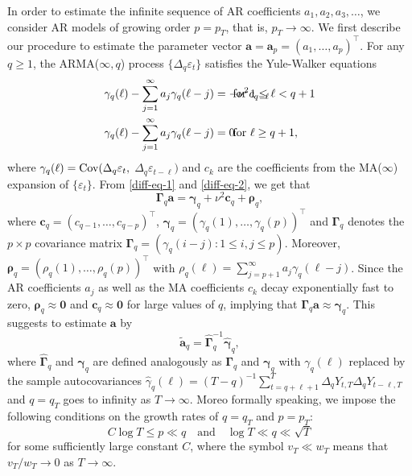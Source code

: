 In order to estimate the infinite sequence of AR coefficients $a_1,a_2,a_3,\ldots$, we consider AR models of growing order $p = p_T$, that is, $p_T \rightarrow \infty$. We first describe our procedure to estimate the parameter vector $\boldsymbol{a} = \boldsymbol{a}_p = (a_1,\ldots,a_p)^\top$. For any $q \ge 1$, the ARMA($\infty,q$) process $\{ \Delta_q \varepsilon_t \}$ satisfies the Yule-Walker equations
\begin{align}
\gamma_q(\ell) - \sum\limits_{j=1}^\infty a_j \gamma_q(\ell-j) & = -\nu^2 c_{q-\ell} \hspace{-1.5cm} & & \text{for } 1 \le \ell < q+1 \label{diff-eq-1} \\
\gamma_q(\ell) - \sum\limits_{j=1}^\infty a_j \gamma_q(\ell-j) & = 0 \hspace{-1.5cm} & & \text{for } \ell \ge q+1, \label{diff-eq-2}  
\end{align}
where $\gamma_q(\ell) = \textnormal{Cov}(\Delta_q \varepsilon_t,$ $\Delta_q \varepsilon_{t-\ell})$ and $c_k$ are the coefficients from the MA($\infty$) expansion of $\{ \varepsilon_t \}$. From \eqref{diff-eq-1} and \eqref{diff-eq-2}, we get that 
\begin{equation}\label{YW-eq} 
\boldsymbol{\Gamma}_q \boldsymbol{a} = \boldsymbol{\gamma}_q + \nu^2 \boldsymbol{c}_q + \boldsymbol{\rho}_q,  
\end{equation} 
where $\boldsymbol{c}_q = (c_{q-1},\dots,c_{q-p})^\top$, $\boldsymbol{\gamma}_q = (\gamma_q(1),\dots,\gamma_q(p))^\top$ and $\boldsymbol{\Gamma}_q$ denotes the $p \times p$ covariance matrix $\boldsymbol{\Gamma}_q = (\gamma_q(i-j): 1 \le i,j \le p)$. Moreover, $\boldsymbol{\rho}_q = (\rho_q(1),\ldots,\rho_q(p))^\top$ with $\rho_q(\ell) = \sum_{j=p+1}^{\infty} a_j \gamma_q(\ell-j)$. Since the AR coefficients $a_j$ as well as the MA coefficients $c_k$ decay exponentially fast to zero, $\boldsymbol{\rho}_q \approx \boldsymbol{0}$ and $\boldsymbol{c}_q \approx \boldsymbol{0}$ for large values of $q$, implying that $\boldsymbol{\Gamma}_q \boldsymbol{a} \approx \boldsymbol{\gamma}_q$. This suggests to estimate $\boldsymbol{a}$ by 
\begin{equation}\label{est-AR-FS}
\widetilde{\boldsymbol{a}}_q = \widehat{\boldsymbol{\Gamma}}_q^{-1} \widehat{\boldsymbol{\gamma}}_q, 
\end{equation}
where $\widehat{\boldsymbol{\Gamma}}_q$ and $\widehat{\boldsymbol{\gamma}}_q$ are defined analogously as $\boldsymbol{\Gamma}_q$ and $\boldsymbol{\gamma}_q$ with $\gamma_q(\ell)$ replaced by the sample autocovariances $\widehat{\gamma}_q(\ell) = (T-q)^{-1} \sum_{t=q+\ell+1}^T \Delta_q Y_{t,T} \Delta_q Y_{t-\ell,T}$ and $q = q_T$ goes to infinity as $T \rightarrow \infty$. Moreo formally speaking, we impose the following conditions on the growth rates of $q = q_T$ and $p = p_T$: 
\begin{equation}
C \log T \le p \ll q \quad \text{and} \quad \log T \ll q \ll \sqrt{T} 
\end{equation}
for some sufficiently large constant $C$, where the symbol $v_T \ll w_T$ means that $v_T/w_T \rightarrow 0$ as $T \rightarrow \infty$. 


